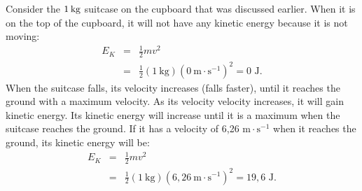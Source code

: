       \label{m38785*id66902}Consider the $1\phantom{\rule{2pt}{0ex}}\text{kg}$ suitcase on the cupboard that was discussed earlier.
When it is on the top of the cupboard, it will not have any kinetic energy because it is not moving:
\begin{eqnarray*}
E_{K} &=& \frac{1}{2}mv^{2} \\
& = & \frac{1}{2}(1~\text{kg})(0~\text{m} \cdot \text{s}^{-1})^{2} = 0 \text{ J}.
\end{eqnarray*}
When the suitcase falls, its velocity increases (falls faster), until it reaches the ground with a maximum velocity.  
As its velocity velocity increases, it will gain kinetic energy. 
Its kinetic energy will increase until it is a maximum when the suitcase reaches the ground.
If it has a velocity of 6,26 $\text{m} \cdot\text{s}^{-1}$ when it reaches the ground, its kinetic energy will be:
\begin{eqnarray*}
E_{K} &=& \frac{1}{2}mv^{2} \\
& = & \frac{1}{2}(1~\text{kg})(6,26~\text{m} \cdot\text{s}^{-1})^{2} = 19,6 \text{ J}.
\end{eqnarray*}

